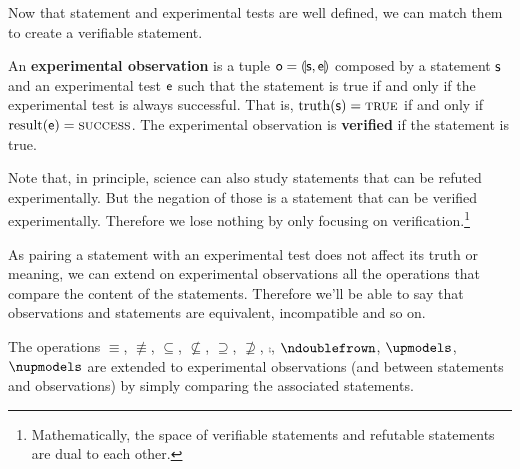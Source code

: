 \documentclass[11pt,letterpaper,fleqn]{memoir} %
\begin{document}
Now that statement and experimental tests are well defined, we can match them to create a verifiable statement.

\begin{mathSection}
\begin{defn}
	An \textbf{experimental observation} is a tuple $\mathsf{o} = \llparenthesis \mathsf{s}, \mathsf{e} \rrparenthesis$ composed by a statement $\mathsf{s}$ and an experimental test $\mathsf{e}$ such that the statement is true if and only if the  experimental test is always successful. That is, $\operatorname{truth}(\mathsf{s})=\textsc{true}$ if and only if $\operatorname{result}(\mathsf{e})=\textsc{success}$. The experimental observation is \textbf{verified} if the statement is true.
\end{defn}
\end{mathSection}

Note that, in principle, science can also study statements that can be refuted experimentally. But the negation of those is a statement that can be verified experimentally. Therefore we lose nothing by only focusing on verification.\footnote{Mathematically, the space of verifiable statements and refutable statements are dual to each other.}

As pairing a statement with an experimental test does not affect its truth or meaning, we can extend on experimental observations all the operations that compare the content of the statements. Therefore we'll be able to say that observations and statements are equivalent, incompatible and so on.

\begin{mathSection}
\begin{defn}
	The operations $\equiv$, $\nequiv$, $\subseteq$, $\nsubseteq$, $\supseteq$, $\nsupseteq$, $\comp$, $\ncomp$, $\indep$, $\nindep$ are extended to experimental observations (and between statements and observations) by simply comparing the associated statements.
\end{defn}
\end{mathSection}
\end{document}
